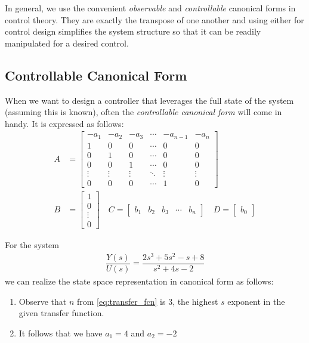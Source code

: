 In general, we use the convenient \textit{observable} and \textit{controllable} canonical forms in control theory. They are exactly the transpose of one another and using either for control design simplifies the system structure so that it can be readily manipulated for a desired control.

\subsection{Controllable Canonical Form}

When we want to design a controller that leverages the full state of the system (assuming this is known), often the \textit{controllable canonical form} will come in handy. It is expressed as follows:
%
\begin{subequations}
	\begin{align}
	A &= \begin{bmatrix} -a_1 & -a_2 & -a_3 & \cdots & -a_{n-1} & -a_n \\
	1 & 0 & 0 & \cdots & 0 & 0 \\
	0 & 1 & 0 & \cdots & 0 & 0 \\
	0 & 0 & 1 & \cdots & 0 & 0 \\
	\vdots & \vdots & \vdots &\ddots & \vdots & \vdots \\
	0 & 0 & 0 & \cdots & 1 & 0 
	\end{bmatrix} 
	\\
		B &= \begin{bmatrix} 1 \\ 0 \\ \vdots \\ 0 \end{bmatrix}
	\quad
	C = \begin{bmatrix} b_1 & b_2 & b_3 & \cdots & b_n \end{bmatrix}
	\quad 
	D = \begin{bmatrix} b_0 \end{bmatrix}
	\end{align}
\end{subequations}

\begin{example}
	For the system 
	\begin{align}
		\dfrac{Y(s)}{U(s)} = \dfrac{2s^3 + 5s^2-s+8}{s^2+4s-2}
	\end{align}
	we can realize the state space representation in canonical form as follows:
	\begin{enumerate}
		\item Observe that $n$ from \eqref{eq:transfer_fcn} is $3$, \ie the highest $s$ exponent in the given transfer function. 
		\item It follows that we have $a_1= 4$ and $a_2 = -2$
	\end{enumerate}
\end{example}
